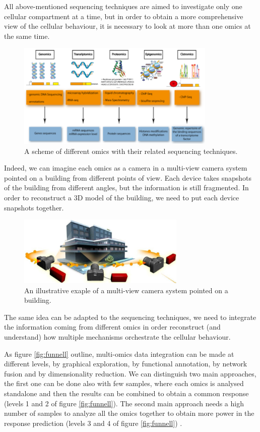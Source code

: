 All above-mentioned sequencing techniques are aimed to investigate only one cellular compartment at a time, but in order to obtain a more comprehensive view of the cellular behaviour, it is necessary to look at more than one omics at the same time.

\begin{figure}[h]
\centering
\includegraphics[width=9.5cm, keepaspectratio]{img/intro/omics.png}
\caption[Omics Representation]{A scheme of different omics with their related sequencing techniques.}
\label{fig:omics}
\end{figure}

Indeed, we can imagine each omics as a camera in a multi-view camera system pointed on a building from different points of view.
Each device takes snapshots of the building from different angles, but the information is still fragmented.
In order to reconstruct a 3D model of the building, we need to put each device snapshots together.

\begin{figure}[h]
\centering
\includegraphics[width=8cm, keepaspectratio]{img/intro/cameras.png}
\caption[Integration cameras]{An illustrative exaple of a multi-view camera system pointed on a building.}
\label{fig:cameras}
\end{figure}

The same idea can be adapted to the sequencing techniques, we need to integrate the information coming from different omics in order reconstruct (and understand) how multiple mechanisms orchestrate the cellular behaviour.

As figure \ref{fig:funnell} outline, multi-omics data integration can be made at different levels, by graphical exploration, by functional annotation, by network fusion and by dimensionality reduction.
We can distinguish two main approaches, the first one can be done also with few samples, where each omics is analysed standalone and then the results can be combined to obtain a common response (levels 1 and 2 of figure \ref{fig:funnell}).
The second main approach needs a high number of samples to analyze all the omics together to obtain more power in the response prediction (levels 3 and 4 of figure \ref{fig:funnell}) \cite{Rohart2017, Argelaguet2018, Jia2017, Meng2016}.


